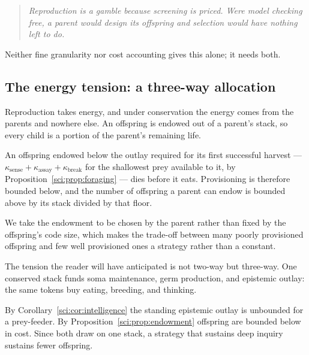 \begin{quote}
\itshape Reproduction is a gamble because screening is priced. Were model checking free, a parent
would design its offspring and selection would have nothing left to do.
\end{quote}

Neither fine granularity nor cost accounting gives this alone; it needs both.

\subsection{The energy tension: a three-way allocation}\label{sci:S12.9}
\label{sci:sec:energy}

Reproduction takes energy, and under conservation the energy comes from the parents and nowhere else.
An offspring is endowed out of a parent's stack, so every child is a portion of the parent's remaining
life.

\begin{proposition}
\label{sci:prop:endowment}
An offspring endowed below the outlay required for its first successful harvest ---
$\kappa_{\mathrm{sense}} + \kappa_{\mathrm{assay}} + \kappa_{\mathrm{break}}$ for the shallowest prey
available to it, by Proposition~\ref{sci:prop:foraging} --- dies before it eats. Provisioning is therefore
bounded below, and the number of offspring a parent can endow is bounded above by its stack divided by
that floor.
\end{proposition}

We take the endowment to be chosen by the parent rather than fixed by the offspring's code size, which
makes the trade-off between many poorly provisioned offspring and few well provisioned ones a strategy
rather than a constant.

The tension the reader will have anticipated is not two-way but three-way. One conserved stack funds
soma maintenance, germ production, and epistemic outlay: the same tokens buy eating, breeding, and
thinking.

\begin{corollary}
\label{sci:cor:kselection}
By Corollary~\ref{sci:cor:intelligence} the standing epistemic outlay is unbounded for a prey-feeder. By
Proposition~\ref{sci:prop:endowment} offspring are bounded below in cost. Since both draw on one stack,
a strategy that sustains deep inquiry sustains fewer offspring.
\end{corollary}

